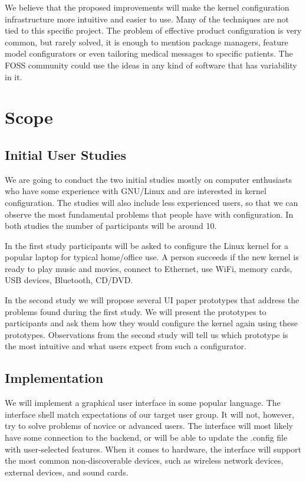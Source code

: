 \documentclass{chi2009}
\begin{document}
We believe that the proposed improvements will make the kernel configuration infrastructure more intuitive and easier to use. Many of the techniques are not tied to this specific project. The problem of effective product configuration is very common, but rarely solved, it is enough to mention package managers, feature model configurators or even tailoring medical messages to specific patients. The FOSS community could use the ideas in any kind of software that has variability in it.

\section{Scope}

\subsection{Initial User Studies}
We are going to conduct the two initial studies mostly on computer enthusiasts who have some experience with GNU/Linux and are interested in kernel configuration. The studies will also include less experienced users, so that we can observe the most fundamental problems that people have with configuration. In both studies the number of participants will be around 10.

In the first study participants will be asked to configure the Linux kernel for a popular laptop for typical home/office use. A person succeeds if the new kernel is ready to play music and movies, connect to Ethernet, use WiFi, memory cards, USB devices, Bluetooth, CD/DVD.

In the second study we will propose several UI paper prototypes that address the problems found during the first study. We will present the prototypes to participants and ask them how they would configure the kernel again using these prototypes. Observations from the second study will tell us which prototype is the most intuitive and what users expect from such a configurator.

\subsection{Implementation}

We will implement a graphical user interface in some popular language. The interface shell match expectations of our target user group. It will not, however, try to solve problems of novice or advanced users. The interface will most likely have some connection to the backend, or will be able to update the \textsf{.config} file with user-selected features. When it comes to hardware, the interface will support the most common non-discoverable devices, such as wireless network devices, external devices, and sound cards.
\end{document}

